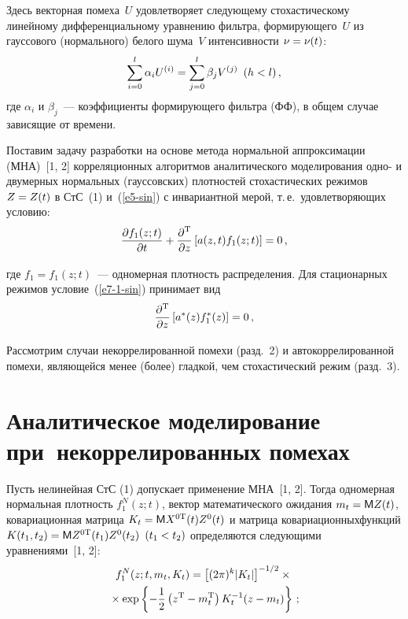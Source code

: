 \begin{multicols}{2}
    
    \noindent
    Здесь векторная помеха~$U$ удовлетворяет следующему стохастическому 
линейному дифференциальному уравнению фильтра, формирующего~$U$ из 
гауссового (нормального) белого шума~$V$ интенсивности $\nu\hm=\nu(t)$:
    \begin{equation}
    \sum\limits_{i=0}^l \alpha_i U^{(i)} =\sum\limits_{j=0}^l \beta_j 
V^{(j)}\enskip (h<l)\,,
    \label{e6-sin}
    \end{equation}
где $\alpha_i$ и $\beta_j$~--- коэффициенты формирующего фильт\-ра (ФФ), в 
общем случае зависящие от времени.
    
    Поставим задачу разработки на основе метода нормальной аппроксимации 
(МНА)~[1, 2] корреляционных алгоритмов аналитического моделирования 
одно- и двумерных нормальных (гауссовских) плот\-но\-стей стохастических 
режимов $Z\hm=Z(t)$ в СтС~(1) и~(\ref{e5-sin}) с инвариантной мерой, т.\,е.\ 
удовлетворяющих условию: 
    \renewcommand{\theequation}{\arabic{equation}$^\prime$}
    \begin{equation}
    \displaystyle\frac{\displaystyle \partial  f_1(z;t)\mathstrut}{\displaystyle \partial t\mathstrut} +\displaystyle\frac{\displaystyle \partial^{\mathrm{T}}\mathstrut}{\displaystyle \partial z\mathstrut}\left[ 
a(z,t)f_1(z;t)\right]=0\,,
     \label{e7-1-sin}
     \end{equation}
     \setcounter{equation}{5}
     
\noindent
где $f_1=f_1(z;t)$~--- одномерная плот\-ность распределения. Для стационарных 
режимов условие~(\ref{e7-1-sin}) принимает вид 
    \renewcommand{\theequation}{\arabic{equation}$^{\prime\prime}$}
    \begin{equation}
    \displaystyle\frac{\displaystyle \partial^{\mathrm{T}}\mathstrut}{\displaystyle \partial z\mathstrut} \left[ a^*(z)f_1^*(z)\right] =0\,,
    \label{e7-2-sin}
    \end{equation}
    \renewcommand{\theequation}{\arabic{equation}}
    \setcounter{equation}{6}
  
  Рассмотрим случаи некоррелированной помехи (разд.~2) и 
автокоррелированной помехи, явля\-ющей\-ся менее (более) гладкой, чем 
стохастический режим (разд.~3).
  
\section{Аналитическое моделирование при~некоррелированных 
помехах}
  
  Пусть нелинейная СтС (1) допускает применение МНА~[1, 2]. Тогда 
одномерная нормальная плот\-ность $f_1^N(z;t)$, вектор математического 
ожидания $m_t\hm={\sf M}Z(t)$, ковариационная мат\-ри\-ца $K_t\hm= {\sf M}X^{0\mathrm{T}}(t) 
Z^0(t)$ и мат\-ри\-ца ковариационных\linebreak функций 
$K(t_1,t_2)\hm={\sf M}Z^{0\mathrm{T}}(t_1)Z^0(t_2)$ $(t_1\hm<t_2)$ опре\-де\-ля\-ют\-ся 
следующими урав\-не\-ни\-ями~[1, 2]:
  \begin{multline}
  f_1^N(z;t,m_t,K_t) =\left[ (2\pi)^k\vert K_t\vert \right]^{-1/2}\times{}\\
  {}\times \exp \left\{ -
\displaystyle\frac{\displaystyle 1\mathstrut}{\displaystyle 2\mathstrut} \left( z^{\mathrm{T}}-m_t^{\mathrm{T}}\right) K_t^{-1}(z-m_t)\right\}\,;\label{e8-sin}
  \end{multline}
  

\end{multicols}
